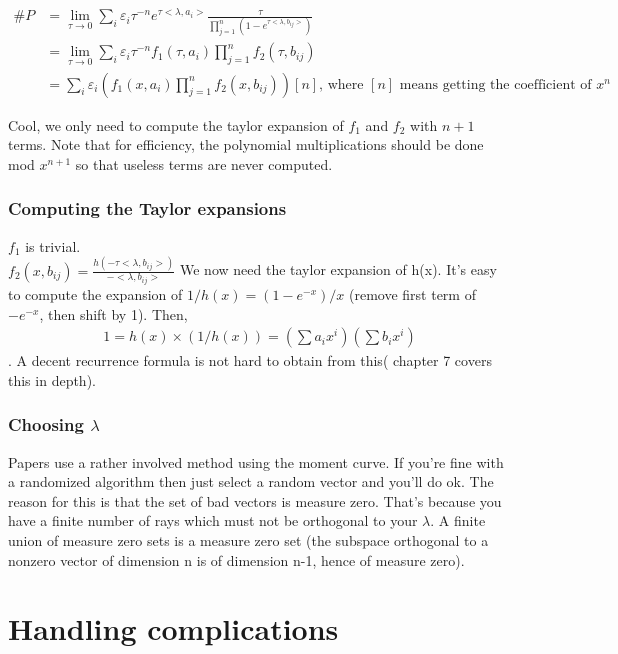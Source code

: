 \documentclass[14pt]{article}
\begin{document}
\begin{align*}
  \#P &= \lim_{\tau \to 0} \sum_i \varepsilon_i \tau ^{-n} e^{\tau <\lambda, a_i>}\frac{\tau}{\prod_{j=1}^n \left(1 - e^{\tau <\lambda, b_{ij}>}\right)} \\ 
  &= \lim_{\tau \to 0} \sum_i \varepsilon_i \tau ^{-n} f_1(\tau, a_i) \prod_{j=1}^n f_2(\tau, b_{ij}) \\ 
  &= \sum_i \varepsilon_i \left(f_1(x, a_i) \prod_{j=1}^n f_2(x, b_{ij})\right)[n]\text{, where $[n]$ means getting the coefficient of $x^n$}
\end{align*}


Cool, we only need to compute the taylor expansion of $f_1$ and $f_2$ with $n+1$ terms. Note that for efficiency, the polynomial multiplications should be done mod $x^{n+1}$ so that useless terms are never computed.

\subsubsection*{Computing the Taylor expansions}

$f_1$ is trivial.\\ 
$f_2(x,b_{ij}) = \frac{h(-\tau <\lambda, b_{ij}>)}{-<\lambda, b_{ij}>}$
We now need the taylor expansion of h(x).
It's easy to compute the expansion of $1/h(x) = (1-e^{-x})/x$ (remove first term of $-e^{-x}$, then shift by 1). Then,
\begin{align*}
1 = h(x) \times (1/h(x)) = (\sum a_i x^i) (\sum b_i x^i)
\end{align*}.
A decent recurrence formula is not hard to obtain from this(\cite{DeLoera2012} chapter 7 covers this in depth).

\subsubsection*{Choosing $\lambda$}

Papers use a rather involved method using the moment curve. If you're fine with a randomized algorithm then just select a random vector and you'll do ok. The reason for this is that the set of bad vectors is measure zero. That's because you have a finite number of rays which must not be orthogonal to your $\lambda$. A finite union of measure zero sets is a measure zero set (the subspace orthogonal to a nonzero vector of dimension n is of dimension n-1, hence of measure zero).


\section*{Handling complications}
\end{document}
